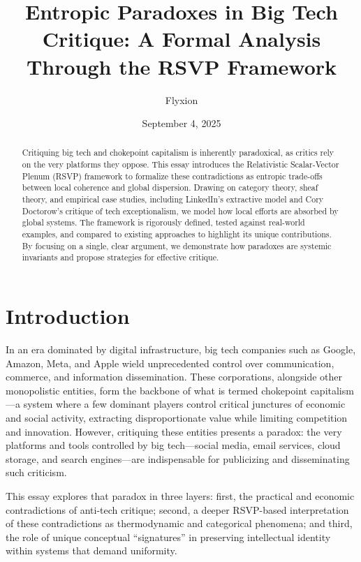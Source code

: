 \documentclass{article}
\title{Entropic Paradoxes in Big Tech Critique: A Formal Analysis Through the RSVP Framework}
\author{Flyxion}
\date{September 4, 2025}
\begin{document}
\maketitle

\begin{abstract}
Critiquing big tech and chokepoint capitalism is inherently paradoxical, as critics rely on the very platforms they oppose. This essay introduces the Relativistic Scalar-Vector Plenum (RSVP) framework to formalize these contradictions as entropic trade-offs between local coherence and global dispersion. Drawing on category theory, sheaf theory, and empirical case studies, including LinkedIn’s extractive model and Cory Doctorow’s critique of tech exceptionalism, we model how local efforts are absorbed by global systems. The framework is rigorously defined, tested against real-world examples, and compared to existing approaches to highlight its unique contributions. By focusing on a single, clear argument, we demonstrate how paradoxes are systemic invariants and propose strategies for effective critique.
\end{abstract}

\section{Introduction}

In an era dominated by digital infrastructure, big tech companies such as Google, Amazon, Meta, and Apple wield unprecedented control over communication, commerce, and information dissemination. These corporations, alongside other monopolistic entities, form the backbone of what is termed chokepoint capitalism—a system where a few dominant players control critical junctures of economic and social activity, extracting disproportionate value while limiting competition and innovation. However, critiquing these entities presents a paradox: the very platforms and tools controlled by big tech—social media, email services, cloud storage, and search engines—are indispensable for publicizing and disseminating such criticism.

This essay explores that paradox in three layers: first, the practical and economic contradictions of anti-tech critique; second, a deeper RSVP-based interpretation of these contradictions as thermodynamic and categorical phenomena; and third, the role of unique conceptual “signatures” in preserving intellectual identity within systems that demand uniformity.
\end{document}
